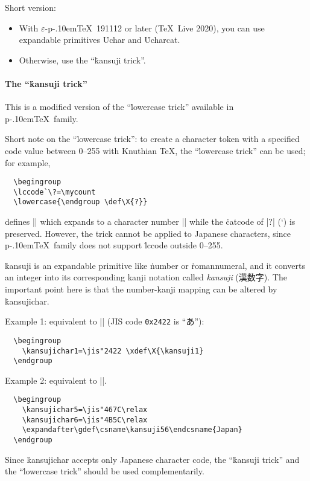 \documentclass[a4paper,11pt,dvipdfmx]{article}
\def\code#1{\texttt{#1}}
\def\Foreign#1{\textit{#1}}
\def\eTeXpre{$\varepsilon$-}
\def\epTeX{\leavevmode\hbox{\eTeXpre\pTeX}}
\def\pTeX{p\kern-.10em\TeX}\def\upTeX{u\pTeX}
\def\TL{\TeX\ Live\xspace}
\begin{document}
Short version:
\begin{itemize}
 \item With \epTeX~191112 or later (\TL2020),
   you can use expandable primitives \.{Uchar} and \.{Ucharcat}.
 \item Otherwise, use the ``\.{kansuji} trick''.
\end{itemize}

\paragraph{The ``\.{kansuji} trick''}
This is a modified version of the ``\.{lowercase} trick''
available in \pTeX\ family.

\begin{dangerous}
Short note on the ``\.{lowercase} trick'':
to create a character token with a specified code value between 0--255
with Knuthian \TeX, the ``\.{lowercase} trick'' can be used; for example,
\begin{verbatim}
  \begingroup
  \lccode`\?=\mycount
  \lowercase{\endgroup \def\X{?}}
\end{verbatim}
defines |\X| which expands to a character number |\mycount|
while the \.{catcode} of |?| (\the\catcode`\?) is preserved.
However, the trick cannot be applied to Japanese characters,
since \pTeX\ family does not support \.{lccode} outside 0--255.
\end{dangerous}

\.{kansuji} is an expandable primitive like \.{number} or \.{romannumeral},
and it converts an integer into its corresponding kanji notation
called \Foreign{kansuji} (漢数字). The important point here is that
the number-kanji mapping can be altered by \.{kansujichar}.

Example 1: equivalent to |\def\X{あ}| (JIS code \code{0x2422} is ``あ''):
\begin{verbatim}
  \begingroup
    \kansujichar1=\jis"2422 \xdef\X{\kansuji1}
  \endgroup
\end{verbatim}

Example 2: equivalent to |\def\日本{Japan}|.
\begin{verbatim}
  \begingroup
    \kansujichar5=\jis"467C\relax
    \kansujichar6=\jis"4B5C\relax
    \expandafter\gdef\csname\kansuji56\endcsname{Japan}
  \endgroup
\end{verbatim}

Since \.{kansujichar} accepts only Japanese character code,
the ``\.{kansuji} trick'' and the ``\.{lowercase} trick'' should be
used complementarily.
\end{document}
